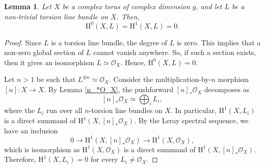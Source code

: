 \documentclass[12pt, reqno]{amsart}
\theoremstyle{plain}
\newtheorem{lemma}[theorem]{Lemma}
\numberwithin{equation}{section}
\begin{document}
\begin{lemma}\label{H^0=H^1=0}
	Let $X$ be a complex torus of complex dimension $g$, and let $L$ be a non-trivial torsion line bundle on $X$. Then, 
	$$\mathrm{H}^0(X,L)=\mathrm{H}^1(X,L)=0.$$
\end{lemma}
\begin{proof}
	Since $L$ is a torsion line bundle, the degree of $L$ is zero. This implies that a non-zero global section of $L$ cannot vanish anywhere. So, if such a section exists, then it gives an isomorphism $L \simeq \mathcal{O}_X$. Hence, $\mathrm{H}^0(X,L)=0$.
	
	Let $n > 1$ be such that $L^{\otimes n} \simeq \mathcal{O}_X$. Consider the multiplication-by-$n$ morphism $ [n] : X \rightarrow X $. By Lemma \ref{n_*O_X}, the pushforward $[n]_{*}\mathcal{O}_X$ decomposes as
	$$
	[n]_{*}\mathcal{O}_X \simeq \bigoplus_{i} L_i ,
	$$
	where the $L_i$ run over all $n$-torsion line bundles on $X$. In particular, $\mathrm{H}^{1}(X,L_i)$ is a direct summand of $\mathrm{H}^{1}(X, [n]_{*}\mathcal{O}_X)$. By the Leray spectral sequence, we have an inclusion 
	$$0 \longrightarrow \mathrm{H}^{1}(X, [n]_{*}\mathcal{O}_X) \longrightarrow \mathrm{H}^{1}(X, \mathcal{O}_X),$$
	which is isomorphism as $\mathrm{H}^{1}(X,\mathcal{O}_X)$ is a direct summand of $\mathrm{H}^{1}(X, [n]_{*}\mathcal{O}_X)$. Therefore, $\mathrm{H}^{1}(X, L_i) = 0$ for every $L_i \neq \mathcal{O}_X$.
\end{proof}
\end{document}
